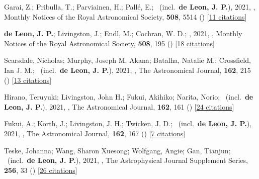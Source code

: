 \item[{\color{numcolor}\scriptsize40}] Garai, Z.; Pribulla, T.; Parviainen, H.; Pall{\'e}, E.; \etal\ (incl.\ \textbf{de Leon, J. P.}), 2021, , Monthly Notices of the Royal Astronomical Society, \textbf{508}, 5514 () [\href{https://ui.adsabs.harvard.edu/abs/2021MNRAS.508.5514G}{11 citations}]

\item[{\color{numcolor}\scriptsize39}] \textbf{de Leon, J. P.}; Livingston, J.; Endl, M.; Cochran, W. D.; \etal, 2021, , Monthly Notices of the Royal Astronomical Society, \textbf{508}, 195 () [\href{https://ui.adsabs.harvard.edu/abs/2021MNRAS.508..195D}{18 citations}]

\item[{\color{numcolor}\scriptsize38}] Scarsdale, Nicholas; Murphy, Joseph M. Akana; Batalha, Natalie M.; Crossfield, Ian J. M.; \etal\ (incl.\ \textbf{de Leon, J. P.}), 2021, , The Astronomical Journal, \textbf{162}, 215 () [\href{https://ui.adsabs.harvard.edu/abs/2021AJ....162..215S}{13 citations}]

\item[{\color{numcolor}\scriptsize37}] Hirano, Teruyuki; Livingston, John H.; Fukui, Akihiko; Narita, Norio; \etal\ (incl.\ \textbf{de Leon, J. P.}), 2021, , The Astronomical Journal, \textbf{162}, 161 () [\href{https://ui.adsabs.harvard.edu/abs/2021AJ....162..161H}{24 citations}]

\item[{\color{numcolor}\scriptsize36}] Fukui, A.; Korth, J.; Livingston, J. H.; Twicken, J. D.; \etal\ (incl.\ \textbf{de Leon, J. P.}), 2021, , The Astronomical Journal, \textbf{162}, 167 () [\href{https://ui.adsabs.harvard.edu/abs/2021AJ....162..167F}{7 citations}]

\item[{\color{numcolor}\scriptsize35}] Teske, Johanna; Wang, Sharon Xuesong; Wolfgang, Angie; Gan, Tianjun; \etal\ (incl.\ \textbf{de Leon, J. P.}), 2021, , The Astrophysical Journal Supplement Series, \textbf{256}, 33 () [\href{https://ui.adsabs.harvard.edu/abs/2021ApJS..256...33T}{26 citations}]

